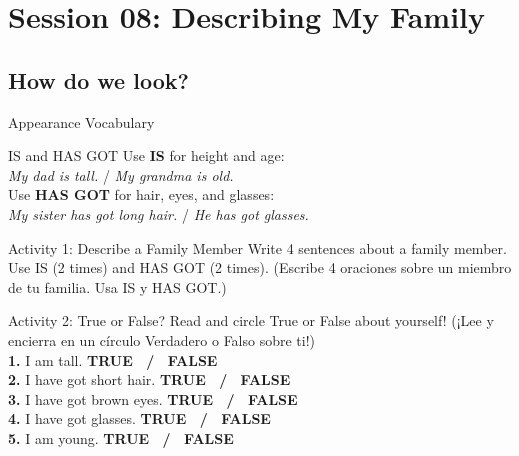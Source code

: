 \section*{Session 08: Describing My Family}
\subsection*{How do we look?}

\begin{vocabcard}{Appearance Vocabulary}
\end{vocabcard}

\begin{grammartip}{IS and HAS GOT}
  Use \textbf{IS} for height and age:\\
  \emph{My dad is tall.} / \emph{My grandma is old.}\\
  Use \textbf{HAS GOT} for hair, eyes, and glasses:\\
  \emph{My sister has got long hair.} / \emph{He has got glasses.}
\end{grammartip}

\begin{activity}{Activity 1: Describe a Family Member}
  Write 4 sentences about a family member. Use IS (2 times) and HAS GOT (2 times). (Escribe 4 oraciones sobre un miembro de tu familia. Usa IS y HAS GOT.)
  \writinglines[4]
\end{activity}

\begin{activity}{Activity 2: True or False?}
  Read and circle True or False about yourself! (¡Lee y encierra en un círculo Verdadero o Falso sobre ti!)\\
  \textbf{1.} I am tall. \hfill \textbf{TRUE \ / \ FALSE}\\
  \textbf{2.} I have got short hair. \hfill \textbf{TRUE \ / \ FALSE}\\
  \textbf{3.} I have got brown eyes. \hfill \textbf{TRUE \ / \ FALSE}\\
  \textbf{4.} I have got glasses. \hfill \textbf{TRUE \ / \ FALSE}\\
  \textbf{5.} I am young. \hfill \textbf{TRUE \ / \ FALSE}
\end{activity}

